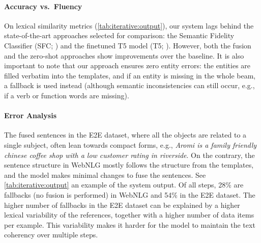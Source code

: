 \paragraph{Accuracy vs.\ Fluency}
On lexical similarity metrics (\autoref{tab:iterative:output}), our system lags behind the state-of-the-art approaches selected for comparison: the Semantic Fidelity Classifier (SFC; \citealp{harkousHaveYourText2020}) and the finetuned T5 model (T5; \citealp{kaleTexttoTextPreTrainingDatatoText2020}). However, both the fusion and the zero-shot approaches show improvements over the baseline. It is also important to note that our approach ensures zero entity errors: the entities are filled verbatim into the templates, and if an entity is missing in the whole beam, a fallback is used instead (although semantic inconsistencies can still occur, e.g., if a verb or function words are missing).

\paragraph{Error Analysis} The fused sentences in the E2E dataset, where all the objects are related to a single subject, often lean towards compact forms, e.g., \textit{Aromi is a family friendly chinese coffee shop with a low customer rating in riverside}. On the contrary, the sentence structure in WebNLG mostly follows the structure from the templates, and the model makes minimal changes to fuse the sentences. See \autoref{tab:iterative:output} an example of the system output. Of all steps, 28\% are fallbacks (no fusion is performed) in WebNLG and 54\% in the E2E dataset.
The higher number of fallbacks in the E2E dataset can be explained by a higher lexical variability of the references, together with a higher number of data items per example. This variability makes it harder for the model to maintain the text coherency over multiple steps.


